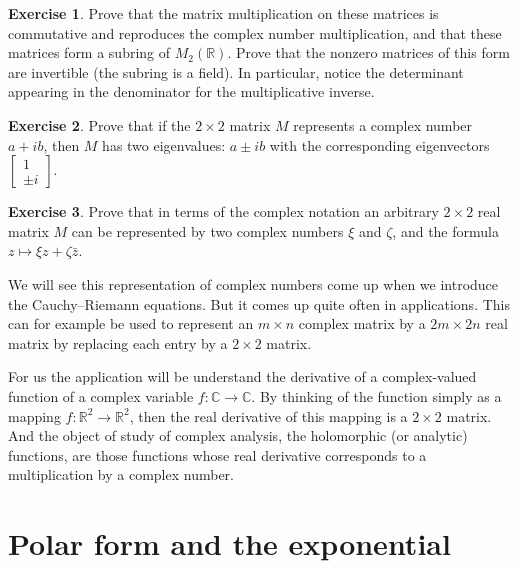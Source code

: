 \documentclass[12pt,openany]{book}
\newcommand{\C}{{\mathbb{C}}}
\newcommand{\R}{{\mathbb{R}}}
\theoremstyle{plain}
\theoremstyle{remark}
\theoremstyle{definition}
\newenvironment{exbox}{%
    \def\FrameCommand{\vrule width 1pt \relax\hspace {10pt}}%
    \MakeFramed {\advance \hsize -\width \FrameRestore }%
}{%
    \endMakeFramed
}
\theoremstyle{exercise}
\newtheorem{exercise}{Exercise}[section]
\theoremstyle{example}
\begin{document}
\begin{exbox}
\begin{exercise}
Prove that the matrix multiplication on these matrices is commutative
and reproduces the complex
number multiplication, and that these matrices form a subring of $M_2(\R)$.
Prove that the nonzero matrices of this form are
invertible (the subring is a field).  In particular, notice the
determinant appearing in the denominator for the multiplicative inverse.
\end{exercise}

\begin{exercise}
Prove that if the $2 \times 2$ matrix $M$ represents a complex number
$a+ib$, then $M$ has two eigenvalues: $a \pm i b$ with the corresponding
eigenvectors $\left[ \begin{smallmatrix} 1 \\ \pm i \end{smallmatrix}
\right]$.
\end{exercise}

\begin{exercise}
Prove that
in terms of the complex notation an arbitrary $2 \times 2$ real matrix $M$
can be represented by two complex numbers $\xi$ and $\zeta$, and the formula
$z \mapsto \xi z + \zeta \bar{z}$.
\end{exercise}
\end{exbox}

We will see this representation of complex numbers come up when we introduce the
Cauchy--Riemann equations.  But it comes up quite often in applications.
This can for example be used to represent an $m \times n$ complex matrix by a
$2m \times 2n$ real matrix by replacing each entry by a $2 \times 2$ matrix.

For us the application will be understand the derivative of a
complex-valued function of a complex variable $f \colon \C \to \C$.
By thinking of the function simply as a mapping $f \colon \R^2 \to \R^2$,
then the real derivative of this mapping is a $2 \times 2$ matrix.  And the
object of study of complex analysis, the holomorphic (or analytic)
functions, are those functions whose real derivative corresponds to a
multiplication by a complex number.


\section{Polar form and the exponential}
\end{document}
